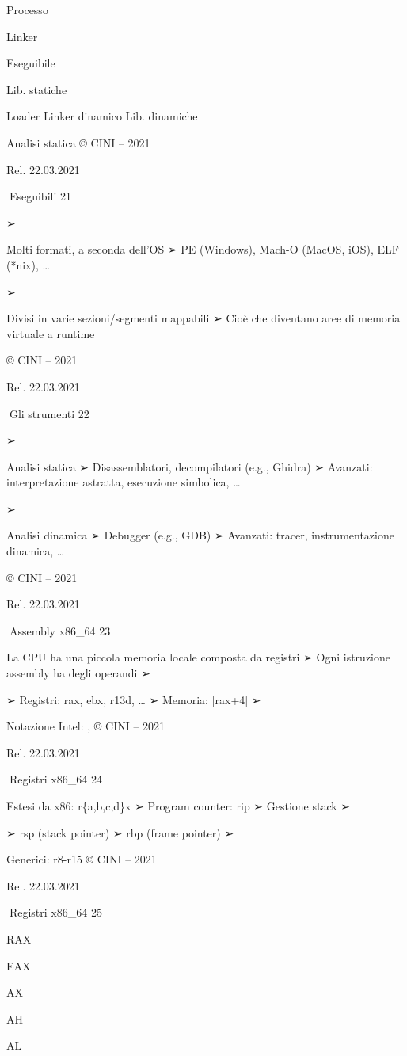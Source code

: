 \documentclass[11pt,a4paper]{article}
\begin{document}
Processo

Linker

Eseguibile

Lib. statiche

Loader Linker dinamico Lib. dinamiche

Analisi statica © CINI -- 2021

Rel. 22.03.2021

Eseguibili 21

➢

Molti formati, a seconda dell'OS ➢ PE (Windows), Mach-O (MacOS, iOS),
ELF (*nix), \ldots{}

➢

Divisi in varie sezioni/segmenti mappabili ➢ Cioè che diventano aree di
memoria virtuale a runtime

© CINI -- 2021

Rel. 22.03.2021

Gli strumenti 22

➢

Analisi statica ➢ Disassemblatori, decompilatori (e.g., Ghidra) ➢
Avanzati: interpretazione astratta, esecuzione simbolica, \ldots{}

➢

Analisi dinamica ➢ Debugger (e.g., GDB) ➢ Avanzati: tracer,
instrumentazione dinamica, \ldots{}

© CINI -- 2021

Rel. 22.03.2021

Assembly x86\_64 23

La CPU ha una piccola memoria locale composta da registri ➢ Ogni
istruzione assembly ha degli operandi ➢

➢ Registri: rax, ebx, r13d, \ldots{} ➢ Memoria: {[}rax+4{]} ➢

Notazione Intel: , © CINI -- 2021

Rel. 22.03.2021

Registri x86\_64 24

Estesi da x86: r\{a,b,c,d\}x ➢ Program counter: rip ➢ Gestione stack ➢

➢ rsp (stack pointer) ➢ rbp (frame pointer) ➢

Generici: r8-r15 © CINI -- 2021

Rel. 22.03.2021

Registri x86\_64 25

RAX

EAX

AX

AH

AL
\end{document}
